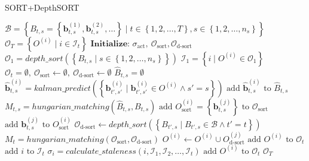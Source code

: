         \begin{algorithm}[t]
            \caption{SORT+DepthSORT}
            \label{alg:sort_depthsort}
            \small
            \begin{algorithmic}[1]
                \Require $\mathcal{B} = \left\{B_{t,s} = \left\{\bm{b}_{t,s}^{(1)}, \bm{b}_{t,s}^{(2)}, \dots\right\} \mid t \in \left\{1, 2, \dots, T\right\}, s \in \left\{1, 2, \dots, n_s\right\}\right\}$
                \Ensure $\mathcal{O}_T = \left\{O^{(i)} \mid i \in \mathcal{I}_t\right\}$
                \State $\textbf{Initialize: } \sigma_{\text{act}},\ \mathcal{O}_{\text{sort}}, \mathcal{O}_{\text{d-sort}}$
                \State $\mathcal{O}_1 = depth\_sort(\left\{B_{t, s} \mid s \in \left\{1, 2, \dots, n_s\right\}\right\})$
                \State $\mathcal{I}_1 = \left\{i \mid O^{(i)} \in \mathcal{O}_1\right\}$
                    \State $\mathcal{O}_t = \emptyset,\ \mathcal{O}_{\text{sort}} \gets \emptyset,\ \mathcal{O}_{\text{d-sort}} \gets \emptyset$
                        \State $\hat{B}_{t,s} = \emptyset$
                            \State $\hat{\bm{b}}_{t,s}^{(i)} = kalman\_predict\left(\left\{\bm{b}_{t',s'}^{(i)} \mid \bm{b}_{t',s'}^{(i)} \in O^{(i)} \land s' = s\right\}\right)$
                            \State $\text{add } \hat{\bm{b}}_{t,s}^{(i)} \text{ to }\hat{B}_{t,s}$
                        \EndFor
                        \State $M_{t,s} = hungarian\_matching(\hat{B}_{t,s}, B_{t,s})$
                                \State $\text{add } O_{\text{sort}}^{(i)} = \left\{\bm{b}_{t,s}^{(j)}\right\} \text{ to } \mathcal{O}_{\text{sort}}$
                            \Else
                                \State $\text{add } \bm{b}_{t,s}^{(j)} \text{ to } O_{\text{sort}}^{(i)}$
                            \EndIf
                        \EndFor
                    \EndFor 
                    \State $\mathcal{O}_{\text{d-sort}} \gets depth\_sort\left(\left\{B_{t',s} \mid B_{t',s} \in \mathcal{B} \land t' = t\right\}\right)$
                    \State $M_t = hungarian\_matching(\mathcal{O}_{\text{sort}}, \mathcal{O}_{\text{d-sort}})$
                        \State $O^{(i)} \gets O^{(i)} \cup O_{\text{d-sort}}^{(j)}$
                        \State $\text{add } O^{(i)} \text{ to } \mathcal{O}_t $
                        \State $\text{add } i \text{ to } \mathcal{I}_t$
                    \EndFor
                        \State $\sigma_i = calculate\_staleness(i, \mathcal{I}_1, \mathcal{I}_2, \dots, \mathcal{I}_t)$
                            \State $\text{add } O^{(i)} \text{ to } \mathcal{O}_t$
                        \EndIf
                    \EndFor
                \EndFor
                \State \Return $\mathcal{O}_T$
            \end{algorithmic}
        \end{algorithm}


